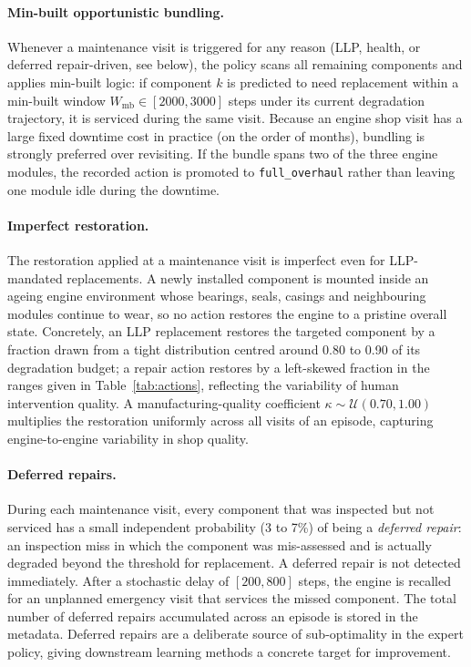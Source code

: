 \paragraph{Min-built opportunistic bundling.}
Whenever a maintenance visit is triggered for any reason (LLP, health,
or deferred repair-driven, see below), the policy scans all remaining
components and applies min-built logic: if component $k$ is predicted
to need replacement within a min-built window $W_\mathrm{mb} \in
[2000, 3000]$ steps under its current degradation trajectory, it is
serviced during the same visit. Because an engine shop visit has a
large fixed downtime cost in practice (on the order of months),
bundling is strongly preferred over revisiting. If the bundle spans
two of the three engine modules, the recorded action is promoted to
\texttt{full\_overhaul} rather than leaving one module idle during
the downtime.

\paragraph{Imperfect restoration.}
The restoration applied at a maintenance visit is imperfect even for
LLP-mandated replacements. A newly installed component is mounted
inside an ageing engine environment whose bearings, seals, casings and
neighbouring modules continue to wear, so no action restores the
engine to a pristine overall state. Concretely, an LLP replacement
restores the targeted component by a fraction drawn from a tight
distribution centred around 0.80 to 0.90 of its degradation budget;
a repair action restores by a left-skewed fraction in the ranges given
in Table~\ref{tab:actions}, reflecting the variability of human
intervention quality. A manufacturing-quality coefficient
$\kappa \sim \mathcal{U}(0.70, 1.00)$ multiplies the restoration
uniformly across all visits of an episode, capturing engine-to-engine
variability in shop quality.

\paragraph{Deferred repairs.}
During each maintenance visit, every component that was inspected but
not serviced has a small independent probability (3 to 7\%) of being
a \emph{deferred repair}: an inspection miss in which the component was
mis-assessed and is actually degraded beyond the threshold for
replacement. A deferred repair is not detected immediately. After a stochastic
delay of $[200, 800]$ steps, the engine is recalled for an unplanned
emergency visit that services the missed component. The total number
of deferred repairs accumulated across an episode is stored in the
metadata. Deferred repairs are a deliberate source of sub-optimality
in the expert policy, giving downstream learning methods a concrete
target for improvement.

